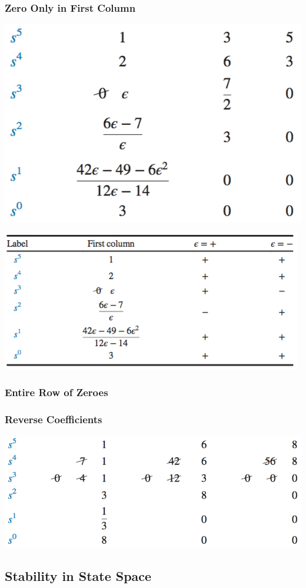 \documentclass[11pt]{article}
\begin{document}
    \subsubsection{Zero Only in First Column}
    \begin{center}
        \includegraphics[width = 300 px]{img/routh-e}        
    \end{center}
    \begin{center}
        \includegraphics[width = 300 px]{img/routh-e2}        
    \end{center}
    \subsubsection{Entire Row of Zeroes}
    \subsubsection{Reverse Coefficients}
    \begin{center}
        \includegraphics[width = 300 px]{img/routh-roz}        
    \end{center}
    \subsection{Stability in State Space}
\end{document}
